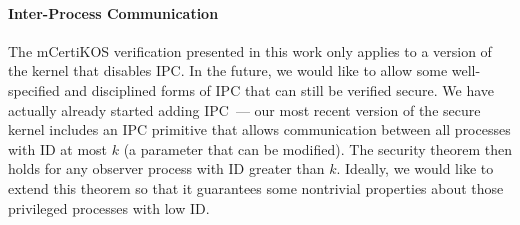 \paragraph{Inter-Process Communication}
The mCertiKOS verification presented in this work only applies to a version of 
the kernel that disables IPC. In the future, we would like to allow some 
well-specified and  disciplined forms of IPC that can still be verified 
secure. We have actually already started adding IPC~--- our most recent version of 
the secure kernel includes an IPC primitive that allows communication between all
processes with ID at most $k$ (a parameter that can be modified). The
security theorem then holds for any observer process with ID greater
than $k$. Ideally, we would like to extend this theorem
so that it guarantees some nontrivial properties about those
privileged processes with low ID.
   


